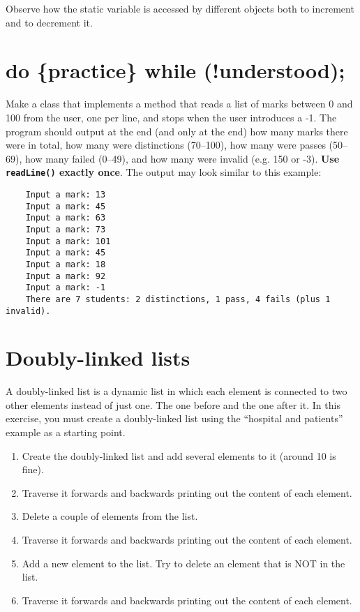 \documentclass{article}
\begin{document}
Observe how the static variable is accessed by different objects both
to increment and to decrement it. 

\section{do \{practice\} while (!understood);}
\label{sec:do-practice-while}

Make a class that implements a method 
that reads a list of marks between 0 and 100 from the
user, one per line, and stops when the user introduces a -1. The
program should output at the end (and only at the end) how many marks
there were in total, how many were distinctions (70--100), how many
were passes (50--69), how many failed (0--49), and how many were
invalid (e.g. 150 or -3). \textbf{Use \texttt{readLine()} exactly once}. The
output may look similar to this example: 

\begin{verbatim}
    Input a mark: 13
    Input a mark: 45
    Input a mark: 63
    Input a mark: 73
    Input a mark: 101
    Input a mark: 45
    Input a mark: 18
    Input a mark: 92
    Input a mark: -1
    There are 7 students: 2 distinctions, 1 pass, 4 fails (plus 1 invalid). 
\end{verbatim}

\section{Doubly-linked lists}
\label{sec:doubly-linked-lists}

A doubly-linked list is a dynamic list in which each element is
connected to two other elements instead of just one. The one before
and the one after it. In this exercise, you must create a
doubly-linked list using the ``hospital and patients'' example as a
starting point.

\begin{enumerate}
\item Create the doubly-linked list and add several elements to it
  (around 10 is fine). 
\item Traverse it forwards and backwards printing out the content of
  each element.
\item Delete a couple of elements from the list. 
\item Traverse it forwards and backwards printing out the content of
  each element.
\item Add a new element to the list. Try to delete an element that is
  NOT in the list. 
\item Traverse it forwards and backwards printing out the content of
  each element.
\end{enumerate}
\end{document}
